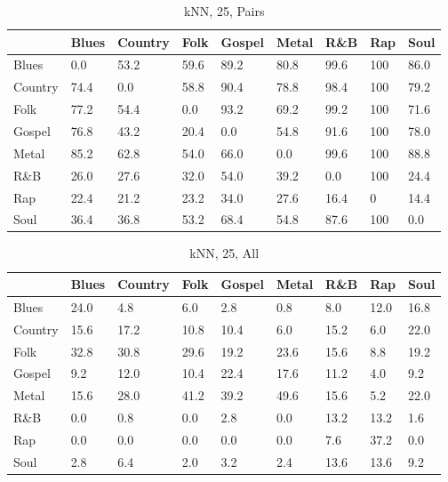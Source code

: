 \documentclass[a4paper,oneside]{article}
\begin{document}
\begin{table}[H]\centering
\caption{kNN, 25, Pairs}
\begin{tabu}{l|*{8}{l}}
 & Blues & Country & Folk & Gospel & Metal & R\&B & Rap & Soul \\ \hline
Blues & 0.0 & 53.2 & 59.6 & 89.2 & 80.8 & 99.6 & 100 & 86.0 \\
Country & 74.4 & 0.0 & 58.8 & 90.4 & 78.8 & 98.4 & 100 & 79.2 \\
Folk & 77.2 & 54.4 & 0.0 & 93.2 & 69.2 & 99.2 & 100 & 71.6 \\
Gospel & 76.8 & 43.2 & 20.4 & 0.0 & 54.8 & 91.6 & 100 & 78.0 \\
Metal & 85.2 & 62.8 & 54.0 & 66.0 & 0.0 & 99.6 & 100 & 88.8 \\
R\&B & 26.0 & 27.6 & 32.0 & 54.0 & 39.2 & 0.0 & 100 & 24.4 \\
Rap & 22.4 & 21.2 & 23.2 & 34.0 & 27.6 & 16.4 & 0 & 14.4 \\
Soul & 36.4 & 36.8 & 53.2 & 68.4 & 54.8 & 87.6 & 100 & 0.0 \\
\end{tabu}
\end{table}

\begin{table}[H]\centering
\caption{kNN, 25, All}
\begin{tabu}{l|*{8}{l}}
 & Blues & Country & Folk & Gospel & Metal & R\&B & Rap & Soul \\ \hline
Blues & 24.0 & 4.8 & 6.0 & 2.8 & 0.8 & 8.0 & 12.0 & 16.8 \\
Country & 15.6 & 17.2 & 10.8 & 10.4 & 6.0 & 15.2 & 6.0 & 22.0 \\
Folk & 32.8 & 30.8 & 29.6 & 19.2 & 23.6 & 15.6 & 8.8 & 19.2 \\
Gospel & 9.2 & 12.0 & 10.4 & 22.4 & 17.6 & 11.2 & 4.0 & 9.2 \\
Metal & 15.6 & 28.0 & 41.2 & 39.2 & 49.6 & 15.6 & 5.2 & 22.0 \\
R\&B & 0.0 & 0.8 & 0.0 & 2.8 & 0.0 & 13.2 & 13.2 & 1.6 \\
Rap & 0.0 & 0.0 & 0.0 & 0.0 & 0.0 & 7.6 & 37.2 & 0.0 \\
Soul & 2.8 & 6.4 & 2.0 & 3.2 & 2.4 & 13.6 & 13.6 & 9.2 \\
\end{tabu}
\end{table}
\end{document}

